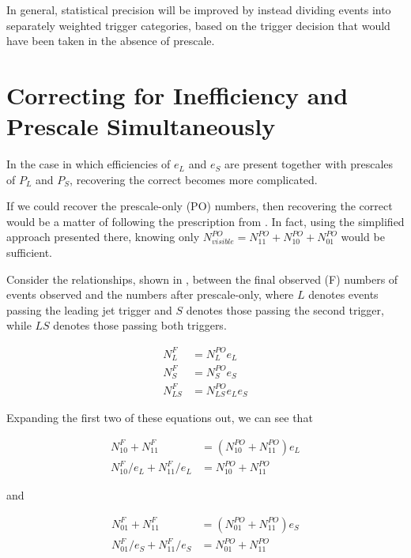 In general, statistical precision will be improved by instead dividing events into separately weighted trigger categories, based on the trigger decision that would have been taken in the absence of prescale.

\section{Correcting for Inefficiency and Prescale Simultaneously}
In the case in which efficiencies of $e_L$ and $e_S$ are present together with prescales of $P_L$ and $P_S$, recovering the correct \xs becomes more complicated.

If we could recover the prescale-only (PO) numbers, then recovering the correct \xs would be a matter of following the prescription from .
In fact, using the simplified approach presented there, knowing only $N^{PO}_{visible} = N^{PO}_{11} + N^{PO}_{10} + N^{PO}_{01}$ would be sufficient.

Consider the relationships, shown in , between the final observed (F) numbers of events observed and the numbers after prescale-only, where $L$ denotes events passing the leading jet trigger and $S$ denotes those passing the second trigger, while $LS$ denotes those passing both triggers.

\begin{equation}
\begin{split}
  N^{F}_{L}  &= N^{PO}_{L} e_L \\
  N^{F}_{S}  &= N^{PO}_{S} e_S \\
  N^{F}_{LS} &= N^{PO}_{LS} e_L e_S
  \label{eq:appendix:relationships}
\end{split}
\end{equation}

\noindent Expanding the first two of these equations out, we can see that

\begin{equation}
\begin{split}
  N^{F}_{10} + N^{F}_{11} &= ( N^{PO}_{10} + N^{PO}_{11} ) e_L \\
  N^{F}_{10} / e_L + N^{F}_{11} / e_L &= N^{PO}_{10} + N^{PO}_{11}
  \label{eq:appendix:leading_only}
\end{split}
\end{equation}

\noindent and

\begin{equation}
\begin{split}
  N^{F}_{01} + N^{F}_{11} &= ( N^{PO}_{01} + N^{PO}_{11} ) e_S \\
  N^{F}_{01} / e_S + N^{F}_{11} / e_S &= N^{PO}_{01} + N^{PO}_{11}
  \label{eq:appendix:subleading_only}
\end{split}
\end{equation}

